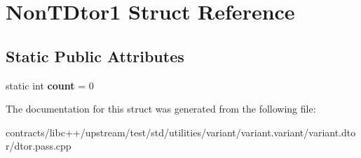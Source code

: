\hypertarget{struct_non_t_dtor1}{}\section{Non\+T\+Dtor1 Struct Reference}
\label{struct_non_t_dtor1}
\subsection*{Static Public Attributes}
\begin{DoxyCompactItemize}
\item 
\mbox{\label{struct_non_t_dtor1_a2ab9fd7c40962d4e42fc7f7daf715e1e}} 
static int {\bfseries count} = 0
\end{DoxyCompactItemize}


The documentation for this struct was generated from the following file\+:\begin{DoxyCompactItemize}
\item 
contracts/libc++/upstream/test/std/utilities/variant/variant.\+variant/variant.\+dtor/dtor.\+pass.\+cpp\end{DoxyCompactItemize}
